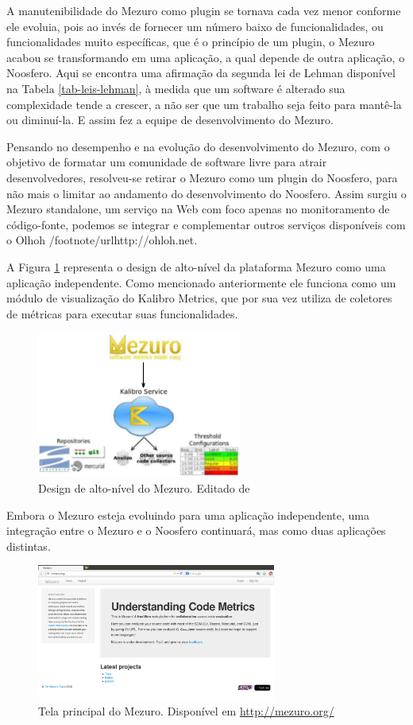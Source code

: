 A manutenibilidade do Mezuro como plugin se tornava cada vez menor conforme ele evoluia, pois ao invés de fornecer um número baixo de funcionalidades, ou funcionalidades muito específicas, que é o princípio de um plugin, o Mezuro acabou se transformando em uma aplicação, a qual depende de outra aplicação, o Noosfero. Aqui se encontra uma afirmação da segunda lei de Lehman disponível na Tabela \ref{tab-leis-lehman}, à medida que um software é alterado sua complexidade tende a crescer, a não ser que um trabalho seja feito para mantê-la ou diminuí-la. E assim fez a equipe de desenvolvimento do Mezuro.

Pensando no desempenho e na evolução do desenvolvimento do Mezuro, com o objetivo de formatar um comunidade de software livre para atrair desenvolvedores, resolveu-se retirar o Mezuro como um plugin do Noosfero, para não mais o limitar ao andamento do desenvolvimento do Noosfero. Assim surgiu o Mezuro standalone, um serviço na Web com foco apenas no monitoramento de código-fonte, podemos se integrar e complementar outros serviços disponíveis com o Olhoh /footnote{/url{http://ohloh.net}}.

A Figura \ref{mezuro-design} representa o design de alto-nível da plataforma Mezuro como uma aplicação independente. Como mencionado anteriormente ele funciona como um módulo de visualização do Kalibro Metrics, que por sua vez utiliza de coletores de métricas para executar suas funcionalidades.

\graphicspath{{figuras/}}
\begin{figure}[H]
\centering
\includegraphics[width=0.6\textwidth]{mezuro-standalone-design}
\caption{Design de alto-nível do Mezuro. Editado de \cite{meirelles2010mezuro}}
\label{mezuro-design}
\end{figure}

Embora o Mezuro esteja evoluindo para uma aplicação independente, uma integração entre o Mezuro e o Noosfero continuará, mas como duas aplicações distintas.

\graphicspath{{figuras/}}
\begin{figure}[H]
\centering
\includegraphics[width=0.7\textwidth]{mezuro-standalone}
\caption{Tela principal do Mezuro. Disponível em \url{http://mezuro.org/}}
\label{mezuro}
\end{figure}




